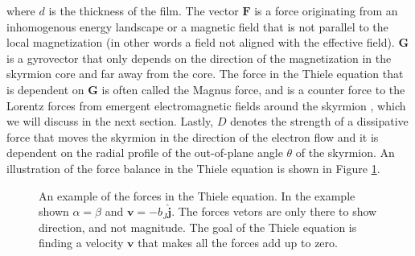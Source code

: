 where $d$ is the thickness of the film. The vector $\mathbold{F}$ is a force originating from an inhomogenous energy landscape or a magnetic field that is not parallel to the local magnetization (in other words a field not aligned with the effective field). $\mathbold{G}$ is a gyrovector that only depends on the direction of the magnetization in the skyrmion core and far away from the core. The force in the Thiele equation that is dependent on $\mathbold{G}$ is often called the Magnus force, and is a counter force to the Lorentz forces from emergent electromagnetic fields around the skyrmion \cite{Everschor-Sitte2014}, which we will discuss in the next section. Lastly, $D$ denotes the strength of a dissipative force that moves the skyrmion in the direction of the electron flow and it is dependent on the radial profile of the out-of-plane angle $\theta$ of the skyrmion. An illustration of the force balance in the Thiele equation is shown in Figure \ref{fig:Thiele}.

\begin{figure}[h!]
\centering
  \centering
\caption{An example of the forces in the Thiele equation. In the example shown $\alpha=\beta$ and $\mathbold{v}=-b_J\mathbold{\hat{j}}$. The forces vetors are only there to show direction, and not magnitude. The goal of the Thiele equation is finding a velocity $\mathbold{v}$ that makes all the forces add up to zero.}
\label{fig:Thiele}
\end{figure}

